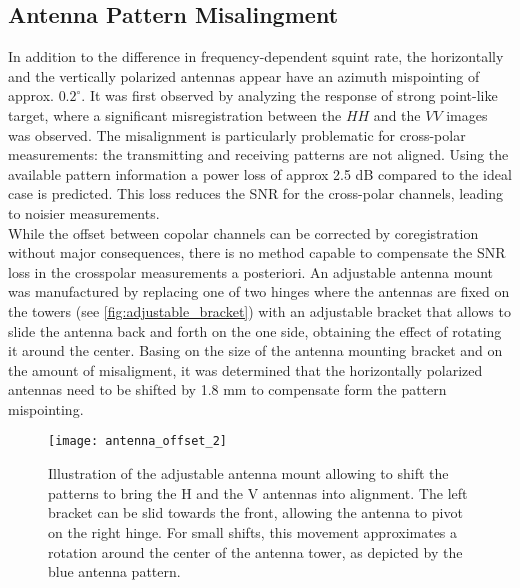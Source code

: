 \subsection{Antenna Pattern Misalingment}\label{sec:misalingment}
In addition to the difference in frequency-dependent squint rate, the horizontally and the vertically polarized antennas appear have an azimuth mispointing of approx. $0.2^\circ$. It was first observed by analyzing the response of strong point-like target, where a significant misregistration between the $HH$ and the $VV$ images was observed. The misalignment is particularly problematic for cross-polar measurements: the transmitting and receiving patterns are not aligned. Using the available pattern information a power loss of approx 2.5 dB  compared to the ideal case is predicted. This loss reduces the SNR for the cross-polar channels, leading to noisier measurements.\\ While the offset between copolar channels can be corrected by coregistration without major consequences, there is no method capable to compensate the SNR loss in the crosspolar measurements a posteriori. An adjustable antenna mount was manufactured by replacing one of two hinges where the antennas are fixed on the towers (see \autoref{fig:adjustable_bracket}) with an adjustable bracket that allows to slide the antenna back and forth on the one side, obtaining the effect of rotating it around the center. Basing on the size of the antenna mounting bracket and on the amount of misaligment, it was determined that the horizontally polarized antennas need to be shifted by 1.8 mm to compensate form the pattern mispointing.
\begin{figure}[ht]
	\centering
	\texttt{[image: antenna\_offset\_2]}
	\caption{Illustration of the adjustable antenna mount allowing to shift the patterns to bring the H and the V antennas into alignment. The left bracket can be slid towards the front, allowing the antenna to pivot on the right hinge. For small shifts, this movement approximates a rotation around the center of the antenna tower, as depicted by the blue antenna pattern.}
	\label{fig:adjustable_bracket}
\end{figure}

